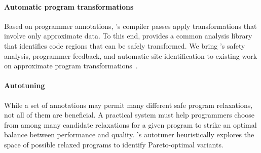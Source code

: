 \paragraph{Automatic program transformations}
Based on programmer annotations, \sysname's compiler passes apply
transformations that involve only approximate data.
To this end,
\sysname provides a common analysis library that identifies code regions
that can be safely transformed.
We bring \sysname's safety analysis, programmer feedback, and automatic site
identification to existing work
on approximate program transformations~\cite{perforation, races-ibm,
rinard-hotpar, quickstep, dubstep, npu, anpu}.

\paragraph{Autotuning}
While a set of annotations may permit many different safe program relaxations,
not all of them are beneficial.
A practical system must help programmers choose from
among many candidate relaxations for a given program to strike an
optimal balance between performance and quality.
\sysname's autotuner heuristically explores the space of possible relaxed
programs to identify Pareto-optimal variants.

